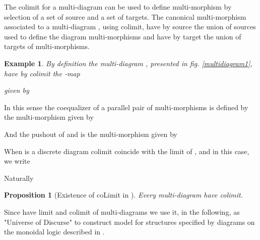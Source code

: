 \documentclass[oribibl]{llncs}
\newtheorem{prop}{Proposition}
\newtheorem{exam}{Example}
\begin{document}
The colimit for a multi-diagram   can be used to define multi-morphism by selection of a set of source and a set of targets. The canonical multi-morphism associated to a multi-diagram , using colimit, have by source  the union of sources used to define the diagram multi-morphisms and have by target  the union of targets of  multi-morphisms.

\begin{exam}
By definition the multi-diagram , presented in fig. \ref{multidiagram1},
have by colimit the -map

given by

\end{exam}

In this sense the coequalizer of a parallel pair of multi-morphisms  is defined by the multi-morphism  given by

And the pushout of  and  is the multi-morphism
 given by


When  is a discrete diagram colimit coincide with the limit of , and in this case, we write


Naturally
\begin{prop}[Existence of coLimit in ]
Every multi-diagram  have colimit.
\end{prop}

Since  have limit and colimit of multi-diagrams we use it, in the following, as "Universe of Discurse" to construct model for structures specified by diagrams on the monoidal logic described in .
\end{document}
